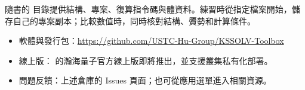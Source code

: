 隨書的  目錄提供結構、專案、復算指令碼與體資料。練習時從指定檔案開始，儲存自己的專案副本；比較數值時，同時核對結構、贗勢和計算條件。

\vspace{\baselineskip}

\begin{itemize}
\item 軟體與發行包：\url{https://github.com/USTC-Hu-Group/KSSOLV-Toolbox}
\item 線上版：\ksonline{} 的瀚海量子\regmark{}官方線上版即將推出，並支援叢集私有化部署。
\item 問題反饋：上述倉庫的 Issues 頁面；也可從應用選單進入相關資源。
\end{itemize}

\clearpage
